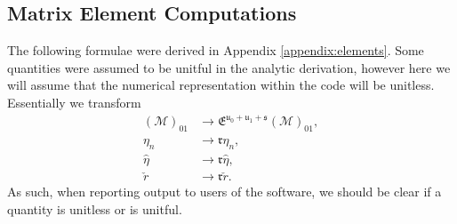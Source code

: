 






\subsection{Matrix Element Computations}
\label{subsection:mat-elem-comp}

The following formulae were derived in Appendix \ref{appendix:elements}. Some quantities were assumed to be unitful in the analytic derivation, however here we will assume that the numerical representation within the code will be unitless. Essentially we transform
\begin{align}
\left(\mathcal{M}\right)_{01}
    &\rightarrow
        \mathfrak{E}^{\mathfrak{u}_{0}+\mathfrak{u}_{1}+\mathfrak{s}}
        \left(\mathcal{M}\right)_{01}
,\\
\eta_{n}
    &\rightarrow
        \mathfrak{r}\eta_{n}
,\\
\hat{\eta}
    &\rightarrow
        \mathfrak{r}\hat{\eta}
,\\
\check{r}
    &\rightarrow
        \mathfrak{r}\check{r}
.
\end{align}
As such, when reporting output to users of the software, we should be clear if a
quantity is unitless or is unitful.

